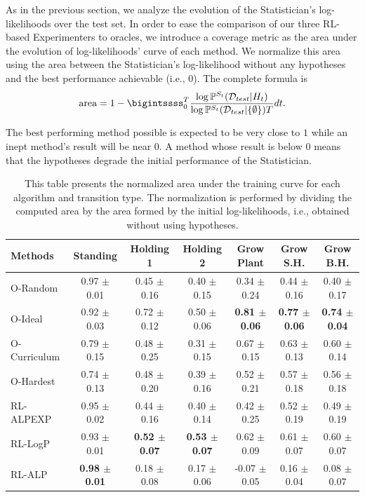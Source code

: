 \documentclass{article}
\begin{document}
As in the previous section, we analyze the evolution of the Statistician's log-likelihoods over the test set. In order to ease the comparison of our three RL-based Experimenters to oracles, we introduce a coverage metric as the area under the evolution of log-likelihoods' curve of each method. We normalize this area using the area between the Statistician's log-likelihood without any hypotheses and the best performance achievable (i.e., 0). The complete formula is
\begin{equation}
    \text{area} = 1-\bigintssss_0^{T}\frac{\log\mathbb{P}^{S_t}(\mathcal{D}_{test}|H_t)}{\log\mathbb{P}^{S_t}(\mathcal{D}_{test}|\{\emptyset\}) T}dt.
    \label{eq:4-worldllm-auc}
\end{equation}

The best performing method possible is expected to be very close to $1$ while an inept method's result will be near $0$. A method whose result is below $0$ means that the hypotheses degrade the initial performance of the Statistician. 

\begin{table}[hbt]
\centering
{\tiny
\begin{tabular}{lcccccc}
\toprule
\textbf{Methods} & \textbf{Standing} & \textbf{Holding 1} & \textbf{Holding 2} & \textbf{Grow Plant} & \textbf{Grow S.H.} & \textbf{Grow B.H.} \\
\midrule
O-Random & 0.97 $\pm$ 0.01 & 0.45 $\pm$ 0.16 & 0.40 $\pm$ 0.15 & 0.34 $\pm$ 0.24 & 0.44 $\pm$ 0.16 & 0.40 $\pm$ 0.17\\
O-Ideal & 0.92 $\pm$ 0.03 & 0.72 $\pm$ 0.12 & 0.50 $\pm$ 0.06 & \textbf{0.81 $\pm$ 0.06} & \textbf{0.77 $\pm$ 0.06} & \textbf{0.74 $\pm$ 0.04} \\
O-Curriculum & 0.79 $\pm$ 0.15 & 0.48 $\pm$ 0.25 & 0.31 $\pm$ 0.15 & 0.67 $\pm$ 0.15 & 0.63 $\pm$ 0.13 & 0.60 $\pm$ 0.14\\
O-Hardest & 0.74 $\pm$ 0.13 & 0.48 $\pm$ 0.20 & 0.39 $\pm$ 0.16 & 0.52 $\pm$ 0.21 & 0.57 $\pm$ 0.18 & 0.56 $\pm$ 0.18\\
\midrule
RL-ALPEXP & 0.95 $\pm$ 0.02 & 0.44 $\pm$ 0.16 & 0.40 $\pm$ 0.14 & 0.42 $\pm$ 0.25 & 0.52 $\pm$ 0.19 & 0.49 $\pm$ 0.19\\
\midrule
RL-LogP & 0.93 $\pm$ 0.01 & \textbf{0.52 $\pm$ 0.07} & \textbf{0.53 $\pm$ 0.07} & 0.62 $\pm$ 0.09 & 0.61 $\pm$ 0.07 & 0.60 $\pm$ 0.07\\
RL-ALP & \textbf{0.98 $\pm$ 0.01} & 0.18 $\pm$ 0.08 & 0.17 $\pm$ 0.06 & -0.07 $\pm$ 0.05 & 0.16 $\pm$ 0.04 & 0.08 $\pm$ 0.07\\
\bottomrule
\end{tabular}}
\caption{This table presents the normalized area under the training curve for each algorithm and transition type. The normalization is performed by dividing the computed area by the area formed by the initial log-likelihoods, i.e., obtained without using hypotheses.}
\label{tab:4-worldllm-loglikelihood_auc}
\end{table}
\end{document}
